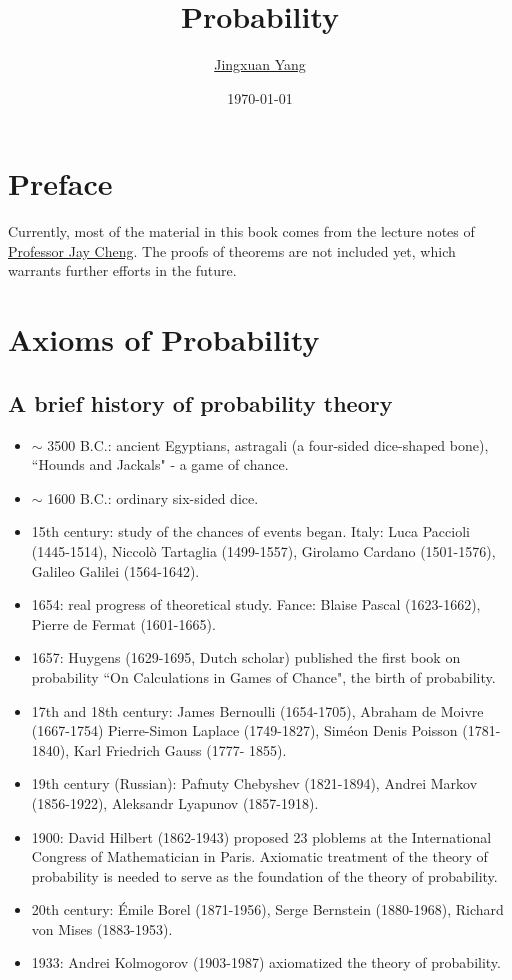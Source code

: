 \documentclass[openany,12pt]{book}
\title{\Huge\textbf{Probability}}
\author{\href{https://www.jingxuanyang.com/}{Jingxuan Yang}}
\date{\today}
\begin{document}
\frontmatter

\maketitle

\tableofcontents

\chapter*{Preface}

Currently, most of the material in this book comes from the lecture notes of \href{https://www.ee.nthu.edu.tw/jcheng/}{Professor Jay Cheng}. The proofs of theorems are not included yet, which warrants further efforts in the future.

\mainmatter

\chapter{Axioms of Probability}

\section{A brief history of probability theory}

\begin{itemize}
  \item $\sim$ 3500 B.C.: ancient Egyptians, astragali (a four-sided dice-shaped bone), ``Hounds and Jackals" - a game of chance.
  \item $\sim$ 1600 B.C.: ordinary six-sided dice.
  \item 15th century: study of the chances of events began. Italy: Luca Paccioli (1445-1514), Niccol\`o Tartaglia (1499-1557), Girolamo Cardano (1501-1576), Galileo Galilei (1564-1642).
  \item 1654: real progress of theoretical study.
  Fance: Blaise Pascal (1623-1662), Pierre de Fermat (1601-1665).
  \item 1657: Huygens (1629-1695, Dutch scholar) published the first book on probability ``On Calculations in Games of Chance", the birth of probability.
  \item 17th and 18th century: James Bernoulli (1654-1705), Abraham de Moivre (1667-1754)
  Pierre-Simon Laplace (1749-1827), Sim\'eon Denis Poisson (1781-1840), Karl Friedrich Gauss (1777- 1855).
  \item 19th century (Russian): Pafnuty Chebyshev (1821-1894), Andrei Markov (1856-1922), Aleksandr Lyapunov (1857-1918).
  \item 1900: David Hilbert (1862-1943) proposed 23 ploblems at the International Congress of Mathematician in Paris. Axiomatic treatment of the theory of probability is needed to serve as the foundation of the theory of probability.
  \item 20th century: \'Emile Borel (1871-1956), Serge Bernstein (1880-1968), Richard von Mises (1883-1953).
  \item 1933: Andrei Kolmogorov (1903-1987) axiomatized the theory of probability.
\end{itemize}
\end{document}
